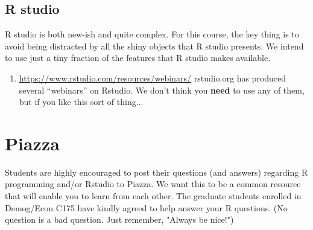\documentclass[11pt]{article}
\begin{document}
\subsection{R studio}
\label{sec:Rstud}

R studio is both new-ish and quite complex. For this course, the key thing is to avoid being distracted by all the shiny objects that R studio presents.  We intend to use just a tiny fraction of the features that R studio makes available.
\begin{enumerate}
\item \url{https://www.rstudio.com/resources/webinars/} rstudio.org has produced several ``webinars'' on Rstudio.  We don't think you \textbf{need} to  use any of them, but if you like this sort of thing...
\end{enumerate}

\section{Piazza}
\label{sec:piazza}

Students are highly encouraged to post their questions (and answers)
regarding R programming and/or Rstudio to Piazza. We want this to be a common
resource that will enable you to learn from each other. The graduate
students enrolled in Demog/Econ C175 have kindly agreed to help answer your R
questions. (No question is a bad question. Just remember, "Always be
nice!")
\end{document}
